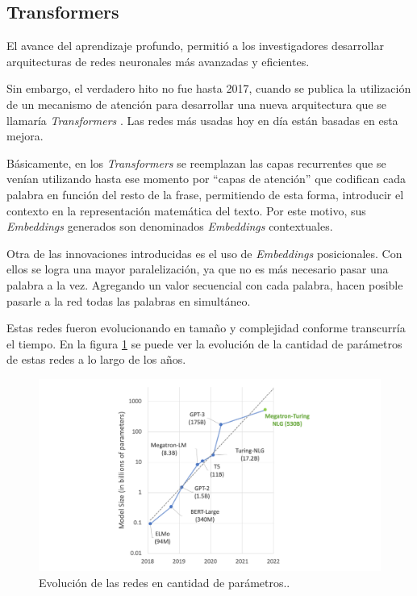 \subsection{Transformers}

El avance del aprendizaje profundo, permitió a los investigadores desarrollar arquitecturas de redes neuronales más avanzadas y eficientes. 

Sin embargo, el verdadero hito no fue hasta 2017, cuando se publica la utilización de un mecanismo de atención para desarrollar una nueva arquitectura que se llamaría \textit{Transformers} \citep{ARTICLE:5}. Las redes más usadas hoy en día están basadas en esta mejora.

Básicamente, en los \textit{Transformers} se reemplazan las capas recurrentes que se venían utilizando hasta ese momento por ``capas de atención'' que codifican cada palabra en función del resto de la frase, permitiendo de esta forma, introducir el contexto en la representación matemática del texto. Por este motivo, sus \textit{Embeddings} generados son denominados \textit{Embeddings} contextuales.

Otra de las innovaciones introducidas es el uso de \textit{Embeddings} posicionales. Con ellos se logra una mayor paralelización, ya que no es más necesario pasar una palabra a la vez. Agregando un valor secuencial con cada palabra, hacen posible pasarle a la red todas las palabras en simultáneo.

Estas redes fueron evolucionando en tamaño y complejidad conforme transcurría el tiempo. En la figura \ref{fig:transformers} se puede ver la evolución de la cantidad de parámetros de estas redes a lo largo de los años.

\begin{figure}[htbp]
	\centering
	\includegraphics[width=1\textwidth]{./Figures/transformers.png}
	\caption{Evolución de las redes en cantidad de parámetros.\protect\footnotemark.}
	\label{fig:transformers}
\end{figure}


